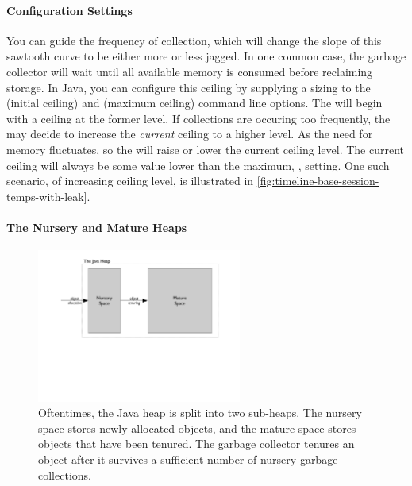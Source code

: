 \paragraph{Configuration Settings}
You can guide the frequency of collection, which will change the slope of this
sawtooth curve to be either more or less jagged. In one common case, the garbage
collector will wait until all available memory is consumed before reclaiming
storage.  In Java, you can configure this ceiling by supplying a sizing to the
 (initial ceiling) and
 (maximum ceiling) command line options. 
 The \jre will begin with a ceiling at the
former level. If collections are occuring too frequently, the \jre may decide to
increase the \emph{current} ceiling to a higher level. As the need for memory
fluctuates, so the \jre will raise or lower the current ceiling level. The
current ceiling will always be some value lower than the maximum, ,
setting. One such scenario, of increasing ceiling level, is illustrated in
\autoref{fig:timeline-base-session-temps-with-leak}.

\paragraph{The Nursery and Mature Heaps}

\begin{figure}
\centering
	\includegraphics[width=0.6\textwidth]{part4/Figures/nursery}
	\caption{Oftentimes, the Java heap is split into two sub-heaps. The nursery
	space stores newly-allocated objects, and the mature space stores objects that
	have been tenured. The garbage collector tenures an object after it
	survives a sufficient number of nursery garbage collections.}
	\label{fig:nursery-and-mature}
\end{figure}

